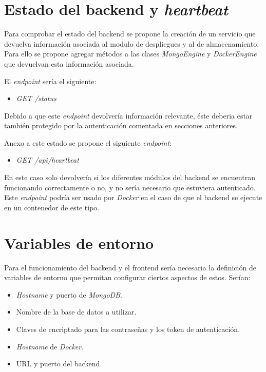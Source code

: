 \section{Estado del backend y \textit{heartbeat}}


Para comprobar el estado del backend se propone la creación de un servicio que devuelva información asociada al modulo de despliegues y al de almacenamiento. Para ello se propone agregar métodos a las clases \textit{MongoEngine} y \textit{DockerEngine} que devuelvan esta información asociada.

\bigskip
El \textit{endpoint} sería el siguiente:
\begin{itemize}
	\item \textit{GET /status}
\end{itemize}

\bigskip
Debido a que este \textit{endpoint} devolvería información relevante, éste deberia estar también protegido por la autenticación comentada en secciones anteriores.

\bigskip
Anexo a este estado se propone el siguiente \textit{endpoint}:
\begin{itemize}
	\item \textit{GET /api/heartbeat}
\end{itemize}


\bigskip
En este caso solo devolvería si los diferentes módulos del backend se encuentran funcionando correctamente o no, y no sería necesario que estuviera autenticado. Este \textit{endpoint} podría ser usado por \textit{Docker} en el caso de que el backend se ejecute en un contenedor de este tipo.



\section{Variables de entorno}


Para el funcionamiento del backend y el frontend sería necesaria la definición de variables de entorno que permitan configurar ciertos aspectos de estos. Serían:
\begin{itemize}
	\item \textit{Hostname} y puerto de \textit{MongoDB}.
	\item Nombre de la base de datos a utilizar.
	\item Claves de encriptado para las contraseñas y los token de autenticación.
	\item \textit{Hostname} de \textit{Docker}.
	\item URL y puerto del backend.
\end{itemize}






